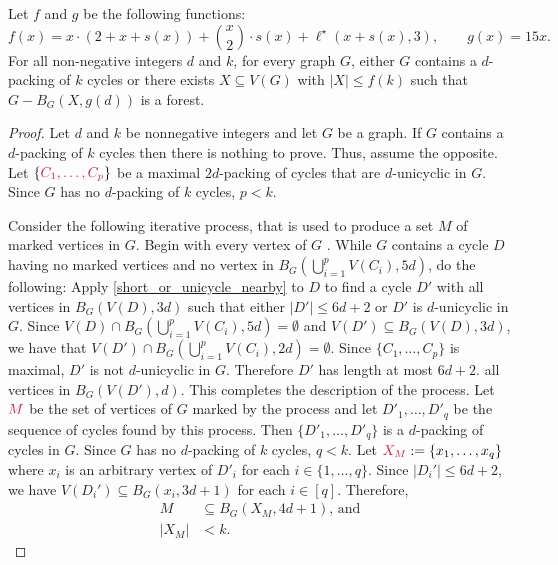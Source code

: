 \documentclass{patmorin}
\DeclarePairedDelimiter\set{\{}{\}}
\begin{document}
\begin{thm}\label{thm:the-big-ball-of-wax}
  Let $f$ and $g$ be the following functions:
  \[
    \textstyle f(x)=
  x\cdot (2+x+s(x)) + \binom{x}{2}\cdot s(x) + \ell^\star(x+s(x),3), \qquad
    g(x)= 15x.
  \]
  For all non-negative integers $d$ and $k$, for every graph $G$, either $G$ contains a $d$-packing of $k$ cycles or there exists $X\subseteq V(G)$ with $|X|\leq f(k)$ such that $G-B_G(X,g(d))$ is a forest.
\end{thm}

\begin{proof}
  Let $d$ and $k$ be nonnegative integers and let $G$ be a graph. If $G$ contains a $d$-packing of $k$ cycles then there is nothing to prove. Thus, assume the opposite. Let $\set{\mathdefin{C_1,\ldots,C_p}}$ be a maximal $2d$-packing of cycles that are $d$-unicyclic in $G$.  Since $G$ has no $d$-packing of $k$ cycles, $p<k$.

  Consider the following iterative process, that is used to produce a set $M$ of marked vertices in $G$.  Begin with every vertex of $G$ .  While $G$ contains a cycle $D$ having no marked vertices and no vertex in $B_G(\bigcup_{i=1}^p V(C_i),5d)$, do the following:  Apply \cref{short_or_unicycle_nearby} to $D$ to find a cycle $D'$ with all vertices in  $B_G(V(D),3d)$ such that either $|D'|\leq 6d+2$ or $D'$ is $d$-unicyclic in $G$. Since $V(D)\cap B_G(\bigcup_{i=1}^p V(C_i),5d)=\emptyset$ and $V(D')\subseteq B_G(V(D),3d)$, we have that $V(D')\cap B_G(\bigcup_{i=1}^p V(C_i),2d)=\emptyset$. Since $\{C_1,\ldots,C_p\}$ is maximal, $D'$ is not $d$-unicyclic in $G$.  Therefore $D'$ has length at most $6d+2$.   all vertices in $B_G(V(D'),d)$. This completes the description of the process.  Let $\mathdefin{M}$ be the set of vertices of $G$ marked by the process and let $D'_1,\ldots,D'_{q}$ be the sequence of cycles found by this process. Then $\{D'_1,\ldots,D'_q\}$ is a $d$-packing of cycles in $G$.  Since $G$ has no $d$-packing of $k$ cycles, $q<k$. 
  Let $\mathdefin{X_M}:=\{x_1,\ldots,x_{q}\}$ where  $x_i$ is an arbitrary vertex of $D'_i$ for each $i\in\{1,\ldots,q\}$. 
  Since $|D_i'|\leq 6d+2$, we have $V(D_i')\subseteq B_G(x_i,3d+1)$ for each $i\in[q]$. 
  Therefore, 
\begin{align}
  M&\subseteq B_G(X_M,4d+1)\text{, and}\label{eq:M-contained-in-a-ball}\\
  |X_M|&< k.\label{eq:XM-size}
\end{align}


\end{proof}
\end{document}
